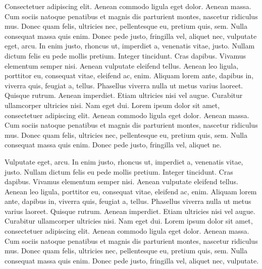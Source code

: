 \documentclass[
    12pt,
    letterpaper,
    oneside,
    noraggedright
]{turabian-researchpaper}
\begin{document}
Consectetuer adipiscing elit. Aenean commodo ligula eget dolor. Aenean
massa. Cum sociis natoque penatibus et magnis dis parturient montes,
nascetur ridiculus mus. Donec quam felis, ultricies nec, pellentesque
eu, pretium quis, sem. Nulla consequat massa quis enim. Donec pede
justo, fringilla vel, aliquet nec, vulputate eget, arcu. In enim justo,
rhoncus ut, imperdiet a, venenatis vitae, justo. Nullam dictum felis eu
pede mollis pretium. Integer tincidunt. Cras dapibus. Vivamus elementum
semper nisi. Aenean vulputate eleifend tellus. Aenean leo ligula,
porttitor eu, consequat vitae, eleifend ac, enim. Aliquam lorem ante,
dapibus in, viverra quis, feugiat a, tellus. Phasellus viverra nulla ut
metus varius laoreet. Quisque rutrum. Aenean imperdiet. Etiam ultricies
nisi vel augue. Curabitur ullamcorper ultricies nisi. Nam eget dui.
Lorem ipsum dolor sit amet, consectetuer adipiscing elit. Aenean commodo
ligula eget dolor. Aenean massa. Cum sociis natoque penatibus et magnis
dis parturient montes, nascetur ridiculus mus. Donec quam felis,
ultricies nec, pellentesque eu, pretium quis, sem. Nulla consequat massa
quis enim. Donec pede justo, fringilla vel, aliquet ne.

Vulputate eget, arcu. In enim justo, rhoncus ut, imperdiet a, venenatis
vitae, justo. Nullam dictum felis eu pede mollis pretium. Integer
tincidunt. Cras dapibus. Vivamus elementum semper nisi. Aenean vulputate
eleifend tellus. Aenean leo ligula, porttitor eu, consequat vitae,
eleifend ac, enim. Aliquam lorem ante, dapibus in, viverra quis, feugiat
a, tellus. Phasellus viverra nulla ut metus varius laoreet. Quisque
rutrum. Aenean imperdiet. Etiam ultricies nisi vel augue. Curabitur
ullamcorper ultricies nisi. Nam eget dui. Lorem ipsum dolor sit amet,
consectetuer adipiscing elit. Aenean commodo ligula eget dolor. Aenean
massa. Cum sociis natoque penatibus et magnis dis parturient montes,
nascetur ridiculus mus. Donec quam felis, ultricies nec, pellentesque
eu, pretium quis, sem. Nulla consequat massa quis enim. Donec pede
justo, fringilla vel, aliquet nec, vulputate.
\end{document}

